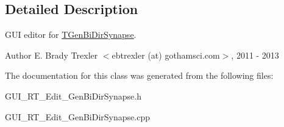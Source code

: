 \subsection{Detailed Description}
G\+U\+I editor for \hyperlink{class_t_gen_bi_dir_synapse}{T\+Gen\+Bi\+Dir\+Synapse}. 

\begin{DoxyAuthor}{Author}
E. Brady Trexler $<$ebtrexler (at) gothamsci.\+com$>$, 2011 -\/ 2013 
\end{DoxyAuthor}


The documentation for this class was generated from the following files\+:\begin{DoxyCompactItemize}
\item 
G\+U\+I\+\_\+\+R\+T\+\_\+\+Edit\+\_\+\+Gen\+Bi\+Dir\+Synapse.\+h\item 
G\+U\+I\+\_\+\+R\+T\+\_\+\+Edit\+\_\+\+Gen\+Bi\+Dir\+Synapse.\+cpp\end{DoxyCompactItemize}
